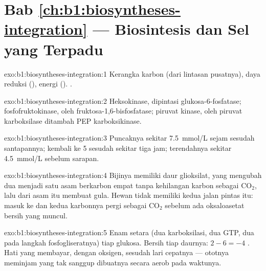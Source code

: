 \section*{Bab \ref{ch:b1:biosyntheses-integration} --- Biosintesis dan Sel yang Terpadu}

\begin{solution}{exo:b1:biosyntheses-integration:1}
Kerangka karbon (dari lintasan pusatnya), daya reduksi (), energi
(). .
\end{solution}

\begin{solution}{exo:b1:biosyntheses-integration:2}
Heksokinase, dipintasi glukosa-6-fosfatase; fosfofruktokinase, oleh
fruktosa-1,6-bisfosfatase; piruvat kinase, oleh piruvat karboksilase
ditambah PEP karboksikinase.
\end{solution}

\begin{solution}{exo:b1:biosyntheses-integration:3}
Puncaknya sekitar \qty{7.5}{mmol/L} sejam sesudah santapannya; kembali
ke \qty{5}{} sesudah sekitar tiga jam; terendahnya sekitar
\qty{4.5}{mmol/L} sebelum sarapan.
\end{solution}

\begin{solution}{exo:b1:biosyntheses-integration:4}
Bijinya memiliki daur glioksilat, yang mengubah dua  menjadi
satu asam berkarbon empat tanpa kehilangan karbon sebagai
$\mathrm{CO_2}$, lalu dari asam itu membuat gula. Hewan tidak memiliki
kedua  jalan pintas itu:  masuk ke  dan
kedua karbonnya pergi sebagai $\mathrm{CO_2}$ sebelum ada oksaloasetat
bersih yang muncul.
\end{solution}

\begin{solution}{exo:b1:biosyntheses-integration:5}
Enam setara  (dua karboksilasi, dua GTP, dua  pada langkah
fosfogliseratnya) tiap glukosa. Bersih tiap daurnya: $2 - 6 = -4$ .
Hati yang membayar, dengan oksigen, sesudah lari cepatnya --- ototnya
meminjam  yang tak sanggup dibuatnya secara aerob pada waktunya.
\end{solution}

